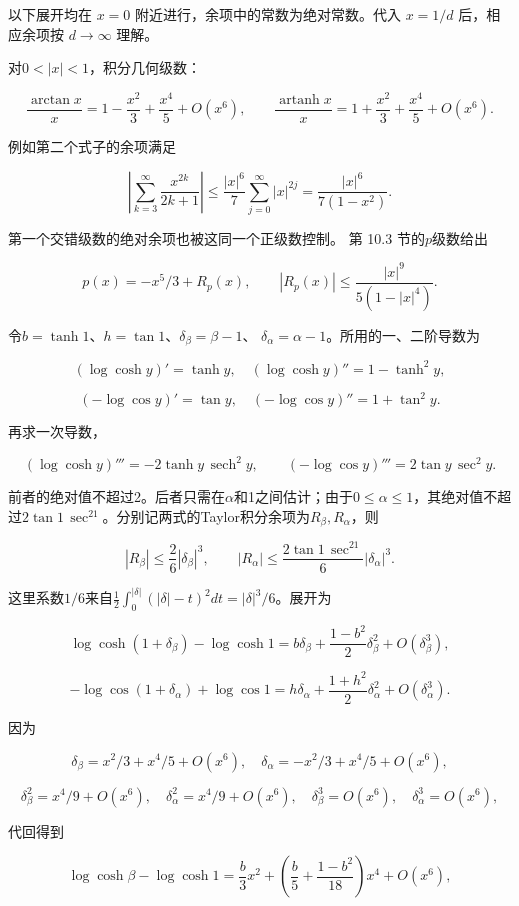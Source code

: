 \documentclass[11pt,a4paper]{article}
\begin{document}
以下展开均在 \(x=0\) 附近进行，余项中的常数为绝对常数。代入 \(x=1/d\) 后，相应余项按 \(d\to\infty\) 理解。

对\(0<|x|<1\)，积分几何级数：

\[
\frac{\arctan x}{x}
=1-\frac{x^2}{3}+\frac{x^4}{5}+O(x^6),
\qquad
\frac{\operatorname{artanh}x}{x}
=1+\frac{x^2}{3}+\frac{x^4}{5}+O(x^6).
\]

例如第二个式子的余项满足

\[
\left|\sum_{k=3}^\infty\frac{x^{2k}}{2k+1}\right|
\le\frac{|x|^6}{7}\sum_{j=0}^\infty|x|^{2j}
=\frac{|x|^6}{7(1-x^2)}.
\]

第一个交错级数的绝对余项也被这同一个正级数控制。 第 10.3 节的\(p\)级数给出

\[
p(x)=-x^5/3+R_p(x),\qquad
|R_p(x)|\le\frac{|x|^9}{5(1-|x|^4)}.
\]

令\(b=\tanh1\)、\(h=\tan1\)、\(\delta_\beta=\beta-1\)、 \(\delta_\alpha=\alpha-1\)。所用的一、二阶导数为

\[
(\log\cosh y)'=\tanh y,\quad
(\log\cosh y)''=1-\tanh^2y,
\]

\[
(-\log\cos y)'=\tan y,\quad
(-\log\cos y)''=1+\tan^2y.
\]

再求一次导数，

\[
(\log\cosh y)'''=-2\tanh y\,\operatorname{sech}^2y,\qquad
(-\log\cos y)'''=2\tan y\,\sec^2y.
\]

前者的绝对值不超过2。后者只需在\(\alpha\)和1之间估计；由于\(0\le\alpha\le1\)，其绝对值不超过\(2\tan1\,\sec^21\)。分别记两式的Taylor积分余项为\(R_\beta,R_\alpha\)，则

\[
|R_\beta|\le\frac{2}{6}|\delta_\beta|^3,\qquad
|R_\alpha|\le\frac{2\tan1\,\sec^21}{6}|\delta_\alpha|^3.
\]

这里系数\(1/6\)来自\(\frac12\int_0^{|\delta|}(|\delta|-t)^2dt=|\delta|^3/6\)。展开为

\[
\log\cosh(1+\delta_\beta)-\log\cosh1
=b\delta_\beta+\frac{1-b^2}{2}\delta_\beta^2
+O(\delta_\beta^3),
\]

\[
-\log\cos(1+\delta_\alpha)+\log\cos1
=h\delta_\alpha+\frac{1+h^2}{2}\delta_\alpha^2
+O(\delta_\alpha^3).
\]

因为

\[
\delta_\beta=x^2/3+x^4/5+O(x^6),\quad
\delta_\alpha=-x^2/3+x^4/5+O(x^6),
\]

\[
\delta_\beta^2=x^4/9+O(x^6),\quad
\delta_\alpha^2=x^4/9+O(x^6),\quad
\delta_\beta^3=O(x^6),\quad\delta_\alpha^3=O(x^6),
\]

代回得到

\[
\log\cosh\beta-\log\cosh1
=\frac b3x^2+
\left(\frac b5+\frac{1-b^2}{18}\right)x^4+O(x^6),
\]
\end{document}
